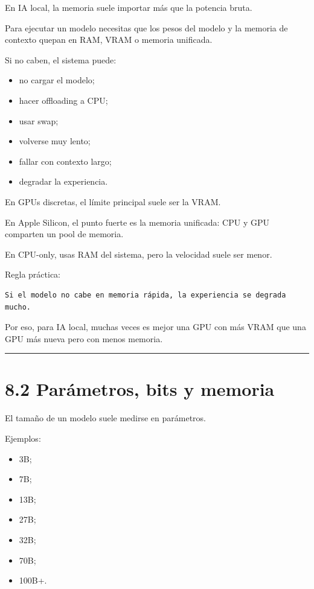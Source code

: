 En IA local, la memoria suele importar más que la potencia bruta.

Para ejecutar un modelo necesitas que los pesos del modelo y la memoria
de contexto quepan en RAM, VRAM o memoria unificada.

Si no caben, el sistema puede:

\begin{itemize}
\tightlist
\item
  no cargar el modelo;
\item
  hacer offloading a CPU;
\item
  usar swap;
\item
  volverse muy lento;
\item
  fallar con contexto largo;
\item
  degradar la experiencia.
\end{itemize}

En GPUs discretas, el límite principal suele ser la VRAM.

En Apple Silicon, el punto fuerte es la memoria unificada: CPU y GPU
comparten un pool de memoria.

En CPU-only, usas RAM del sistema, pero la velocidad suele ser menor.

Regla práctica:

\begin{lstlisting}
Si el modelo no cabe en memoria rápida, la experiencia se degrada mucho.
\end{lstlisting}

Por eso, para IA local, muchas veces es mejor una GPU con más VRAM que
una GPU más nueva pero con menos memoria.

\begin{center}\rule{0.5\linewidth}{0.5pt}\end{center}

\section{8.2 Parámetros, bits y
memoria}\label{paruxe1metros-bits-y-memoria}

El tamaño de un modelo suele medirse en parámetros.

Ejemplos:

\begin{itemize}
\tightlist
\item
  3B;
\item
  7B;
\item
  13B;
\item
  27B;
\item
  32B;
\item
  70B;
\item
  100B+.
\end{itemize}

